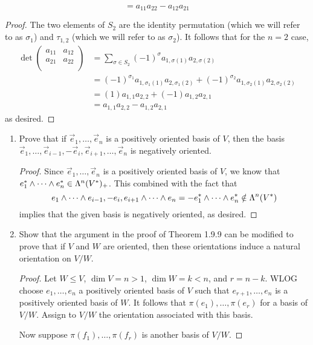 \documentclass[../psets.tex]{subfiles}
\begin{document}
\begin{enumerate}[label={\textbf{1.8.\roman*.}}]
\begin{equation*}
        = a_{11}a_{22}-a_{12}a_{21}
    \end{equation*}
    \begin{proof}
        The two elements of $S_2$ are the identity permutation (which we will refer to as $\sigma_1$) and $\tau_{1,2}$ (which we will refer to as $\sigma_2$). It follows that for the $n=2$ case,
        \begin{align*}
            \det
            \begin{pmatrix}
                a_{11} & a_{12}\\
                a_{21} & a_{22}\\
            \end{pmatrix}
            &= \sum_{\sigma\in S_2}(-1)^\sigma a_{1,\sigma(1)}a_{2,\sigma(2)}\\
            &= (-1)^{\sigma_1}a_{1,\sigma_1(1)}a_{2,\sigma_1(2)}+(-1)^{\sigma_2}a_{1,\sigma_2(1)}a_{2,\sigma_2(2)}\\
            &= (1)a_{1,1}a_{2,2}+(-1)a_{1,2}a_{2,1}\\
            &= a_{1,1}a_{2,2}-a_{1,2}a_{2,1}
        \end{align*}
        as desired.
    \end{proof}
\end{enumerate}
\begin{enumerate}[label={\textbf{1.9.\roman*.}}]
    \item Prove that if $\vec{e}_1,\dots,\vec{e}_n$ is a positively oriented basis of $V$, then the basis $\vec{e}_1,\dots,\vec{e}_{i-1},-\vec{e}_i,\vec{e}_{i+1},\dots,\vec{e}_n$ is negatively oriented.
    \begin{proof}
        Since $\vec{e}_1,\dots,\vec{e}_n$ is a positively oriented basis of $V$, we know that $e_1^*\wedge\cdots\wedge e_n^*\in\lam[n]{V^*}_+$. This combined with the fact that
        \begin{equation*}
            \vec{e}_1\wedge\cdots\wedge\vec{e}_{i-1},-\vec{e}_i,\vec{e}_{i+1}\wedge\cdots\wedge\vec{e}_n = -e_1^*\wedge\cdots\wedge e_n^*
            \notin \lam[n]{V^*}
        \end{equation*}
        implies that the given basis is negatively oriented, as desired.
    \end{proof}
    \item Show that the argument in the proof of Theorem 1.9.9 can be modified to prove that if $V$ and $W$ are oriented, then these orientations induce a natural orientation on $V/W$.
    \begin{proof}
        Let $W\leq V$, $\dim V=n>1$, $\dim W=k<n$, and $r=n-k$. WLOG choose $e_1,\dots,e_n$ a positively oriented basis of $V$ such that $e_{r+1},\dots,e_n$ is a positively oriented basis of $W$. It follows that $\pi(e_1),\dots,\pi(e_r)$ for a basis of $V/W$. Assign to $V/W$ the orientation associated with this basis.\par
        Now suppose $\pi(f_1),\dots,\pi(f_r)$ is another basis of $V/W$.
    \end{proof}
\end{enumerate}
\end{document}
